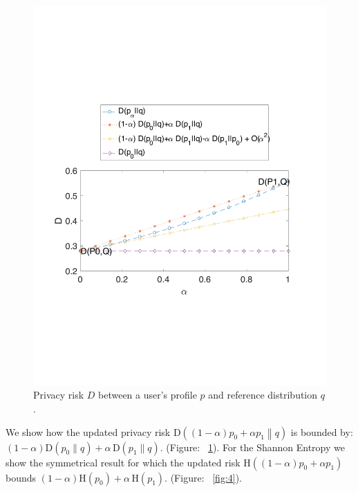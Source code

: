 \begin{figure}[htb]
\includegraphics[scale=\textwidth]{figures/example_1_D.pdf}
\caption[Privacy risk between a user profile and a reference distribution]{Privacy risk $D$ between a user's profile $p$ and reference distribution $q$.}
\label{fig:3}
\end{figure}

We show how the updated privacy risk $\text{D}\left((1-\alpha)p_0+\alpha p_1\middle\|q\right)$ is bounded by: $(1-\alpha)\text{D}(p_0\|q)+\alpha\,\text{D}(p_1\|q).$ (Figure: ~\ref{fig:3}). For the Shannon Entropy we show the symmetrical result for which the updated risk $\text{H}\left((1-\alpha)p_0+\alpha p_1\right)$ bounds $(1-\alpha)\text{H}(p_0)+\alpha\,\text{H}(p_1).$ (Figure: ~\ref{fig:4}).

